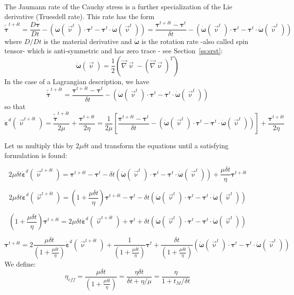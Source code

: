 The Jaumann rate of the Cauchy stress is a further specialization of 
the Lie derivative (Truesdell rate). This rate has the form
\[
\tilde{\dot{\bm \tau}}^{t+\delta t} 
= \frac{D {\bm \tau}}{Dt}
- ( \dot{\bm \omega}(\vec\upnu^t)\cdot {\bm \tau}^t - {\bm \tau}^t \cdot \dot{\bm \omega}(\vec\upnu^t)   )
= \frac{ {\bm \tau}^{t+\delta t} - {\bm \tau}^t }{ \delta t} 
- ( \dot{\bm \omega}(\vec\upnu^t)\cdot {\bm \tau}^t - {\bm \tau}^t \cdot \dot{\bm \omega}(\vec\upnu^t)   )
\]
where $D/Dt$ is the material derivative and $\dot{\bm \omega}$ is the rotation rate -also called spin tensor- which is anti-symmetric and has zero trace - see Section~\ref{ss:srst}:
\[
\dot{\bm \omega}(\vec\upnu) = \frac{1}{2}\left( \vec\nabla\vec \upnu - (\vec\nabla \vec\upnu)^T \right)
\]
In the case of a Lagrangian description, we have \cite{vosc15} 
\[
\tilde{\dot{\bm \tau}}^{t+\delta t} 
= \frac{ {\bm \tau}^{t+\delta t} - {\bm \tau}^t }{ \delta t} 
- ( \dot{\bm \omega}(\vec\upnu^t)\cdot {\bm \tau}^t - {\bm \tau}^t \cdot \dot{\bm \omega}(\vec\upnu^t)   )
\]
so that 
\[
\dot{{\bm \varepsilon}}^d(\vec\upnu^{t+\delta t}) = 
\frac{\tilde{\dot{\bm \tau}}^{t+\delta t}}{2\mu}
+\frac{\bm \tau ^{t+\delta t}}{2 \eta}
=
\frac{1}{2\mu} \left[ \frac{ {\bm \tau}^{t+\delta t} - {\bm \tau}^t }{ \delta t} 
- ( \dot{\bm \omega}(\vec\upnu^t) \cdot {\bm \tau}^t - {\bm \tau}^t \cdot \dot{\bm \omega}(\vec\upnu^t)   )  \right]
+\frac{\bm \tau ^{t+\delta t}}{2 \eta}
\]

Let us multiply this by $2\mu \delta t$ and transform the equations until a satisfying 
formulation is found:

\[
2\mu \delta t\dot{\bm \varepsilon}^d(\vec\upnu^{t+\delta t}) 
=
{\bm \tau}^{t+\delta t} - {\bm \tau}^t 
- \delta t ( \dot{\bm \omega}(\vec\upnu^t) \cdot {\bm \tau}^t - {\bm \tau}^t \cdot \dot{\bm \omega}(\vec\upnu^t)   ) 
+
\frac{\mu \delta t }{ \eta}
{\bm \tau ^{t+\delta t}}   
\]

\[
2\mu \delta t\dot{\bm \varepsilon}^d(\vec\upnu^{t+\delta t}) 
=
\left( 1 + \frac{\mu \delta t }{ \eta}   \right) {\bm \tau}^{t+\delta t} - {\bm \tau}^t 
- \delta t ( \dot{\bm \omega}(\vec\upnu^t) \cdot {\bm \tau}^t - {\bm \tau}^t \cdot \dot{\bm \omega}(\vec\upnu^t)   ) 
\]

\[
\left( 1 + \frac{\mu \delta t }{ \eta}   \right) {\bm \tau}^{t+\delta t} 
=
2\mu \delta t\dot{\bm \varepsilon}^d(\vec\upnu^{t+\delta t}) 
+ {\bm \tau}^t + \delta t ( \dot{\bm \omega}(\vec\upnu^t) \cdot {\bm \tau}^t - {\bm \tau}^t \cdot 
\dot{\bm \omega}(\vec\upnu^t)   ) 
\]

\[
{\bm \tau}^{t+\delta t} 
=
2\frac{\mu \delta t}{\left( 1 + \frac{\mu \delta t }{ \eta}   \right)}  
\dot{\bm \varepsilon}^d(\vec\upnu^{t+\delta t}) 
+ \frac{1}{\left( 1 + \frac{\mu \delta t }{ \eta}   \right)}{\bm \tau}^t 
+ \frac{\delta t}{\left( 1 + \frac{\mu \delta t }{ \eta}   \right)}
 ( \dot{\bm \omega}(\vec\upnu^t) \cdot {\bm \tau}^t - {\bm \tau}^t \cdot \dot{\bm \omega}(\vec\upnu^t)   ) 
\]
We define:
\begin{equation}
\boxed{
\eta_{eff}=\frac{\mu \delta t}{\left( 1 + \frac{\mu \delta t }{ \eta}   \right)} = 
\frac{ \eta \delta t}{\delta t + \eta/\mu} =
 \frac{\eta}{1+ t_M/\delta t}
}
\label{eq:evetaeff}
\end{equation}

